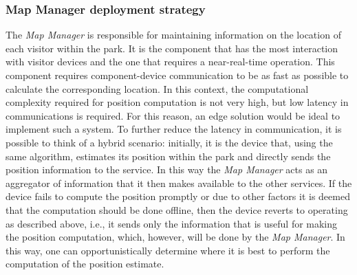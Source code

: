 \subsubsection{Map Manager deployment strategy}
The \textit{Map Manager} is responsible for maintaining information on the location of each visitor within the park. It is the component that has the
most interaction with visitor devices and the one that requires a near-real-time operation. This component requires component-device communication to
be as fast as possible to calculate the corresponding location. In this context, the computational complexity required for position computation is
not very high, but low latency in communications is required. For this reason, an edge solution would be ideal to implement such a system. To further
reduce the latency in communication, it is possible to think of a hybrid scenario: initially, it is the device that, using the same algorithm,
estimates its position within the park and directly sends the position information to the service. In this way the \textit{Map Manager} acts as an
aggregator of information that it then makes available to the other services. If the device fails to compute the position promptly or due to other
factors it is deemed that the computation should be done offline, then the device reverts to operating as described above, i.e., it sends only the
information that is useful for making the position computation, which, however, will be done by the \textit{Map Manager}. In this way, one can
opportunistically determine where it is best to perform the computation of the position estimate.

